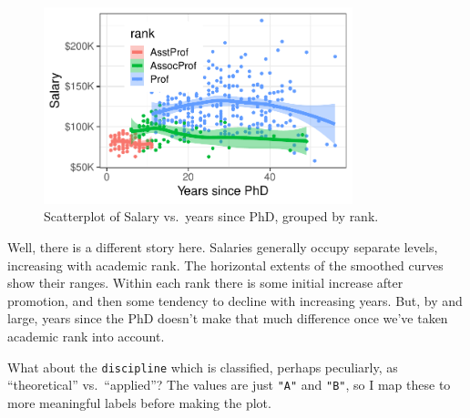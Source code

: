 \documentclass[
  letterpaper,
  10pt,
  krantz2]{krantz}
\begin{document}
\begin{figure}[H]

{\centering \includegraphics[width=0.8\textwidth,height=\textheight]{figs/ch03/fig-Salaries-rank-1.pdf}

}

\caption{\label{fig-Salaries-rank}Scatterplot of Salary vs.~years since
PhD, grouped by rank.}

\end{figure}

Well, there is a different story here. Salaries generally occupy
separate levels, increasing with academic rank. The horizontal extents
of the smoothed curves show their ranges. Within each rank there is some
initial increase after promotion, and then some tendency to decline with
increasing years. But, by and large, years since the PhD doesn't make
that much difference once we've taken academic rank into account.

What about the \texttt{discipline} which is classified, perhaps
peculiarly, as ``theoretical'' vs.~``applied''? The values are just
\texttt{"A"} and \texttt{"B"}, so I map these to more meaningful labels
before making the plot.
\end{document}
